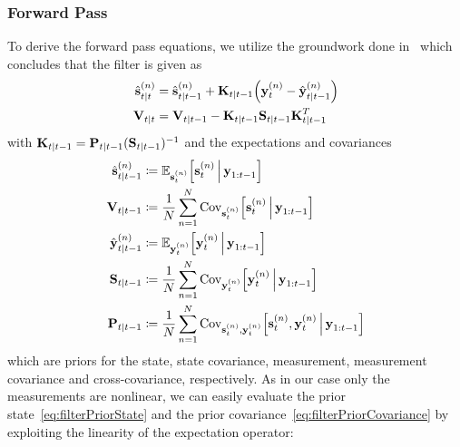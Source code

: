 	\subsubsection{Forward Pass}
		To derive the forward pass equations, we utilize the groundwork done in~\cite{deisenrothProbabilisticPerspectiveGaussian2011} which concludes that the filter is given as
		\begin{align*}
			\hat{\boldsymbol{\mathrm{s}}}_{t \vert t}^{(n)} & = \hat{\boldsymbol{\mathrm{s}}}_{t \vert t - 1}^{(n)} + \boldsymbol{\mathrm{K}}_{t \vert t - 1} \Big(\boldsymbol{\mathrm{y}}_t^{(n)} - \hat{\boldsymbol{\mathrm{y}}}_{t \vert t - 1}^{(n)}\Big) \\
			\boldsymbol{\mathrm{V}}_{t \vert t}       & = \boldsymbol{\mathrm{V}}_{t \vert t - 1} - \boldsymbol{\mathrm{K}}_{t \vert t - 1} \boldsymbol{\mathrm{S}}_{t \vert t - 1} \boldsymbol{\mathrm{K}}_{t \vert t - 1}^T
		\end{align*}
		with \( \boldsymbol{\mathrm{K}}_{t \vert t - 1} = \boldsymbol{\mathrm{P}}_{t \vert t - 1} (\boldsymbol{\mathrm{S}}_{t \vert t - 1})^{-1} \) and the expectations and covariances
		\begin{align}
			\hat{\boldsymbol{\mathrm{s}}}_{t \vert t - 1}^{(n)} & \coloneqq \mathbb{E}_{\boldsymbol{\mathrm{s}}_t^{(n)}}\Big[\boldsymbol{\mathrm{s}}_t^{(n)} \,\Big\vert\, \boldsymbol{\mathrm{y}}_{1:t - 1}\Big]  \label{eq:filterPriorState}                                                                     \\
			\boldsymbol{\mathrm{V}}_{t \vert t - 1}             & \coloneqq \frac{1}{N} \sum_{n = 1}^{N} \operatorname{Cov}_{\boldsymbol{\mathrm{s}}_t^{(n)}}\!\Big[\boldsymbol{\mathrm{s}}_t^{(n)} \,\Big\vert\, \boldsymbol{\mathrm{y}}_{1:t - 1}\Big]  \label{eq:filterPriorCovariance}                               \\
			\hat{\boldsymbol{\mathrm{y}}}_{t \vert t - 1}^{(n)} & \coloneqq \mathbb{E}_{\boldsymbol{\mathrm{y}}_t^{(n)}}\Big[\boldsymbol{\mathrm{y}}_t^{(n)} \,\Big\vert\, \boldsymbol{\mathrm{y}}_{1:t - 1}\Big]  \label{eq:filterPriorMeas}                                                                      \\
			\boldsymbol{\mathrm{S}}_{t \vert t - 1}             & \coloneqq \frac{1}{N} \sum_{n = 1}^{N} \operatorname{Cov}_{\boldsymbol{\mathrm{y}}_t^{(n)}}\!\Big[\boldsymbol{\mathrm{y}}_t^{(n)} \,\Big\vert\, \boldsymbol{\mathrm{y}}_{1:t - 1}\Big]  \label{eq:filterPriorMeasCov}                                  \\
			\boldsymbol{\mathrm{P}}_{t \vert t - 1}             & \coloneqq \frac{1}{N} \sum_{n = 1}^{N} \operatorname{Cov}_{\boldsymbol{\mathrm{s}}_t^{(n)}, \boldsymbol{\mathrm{y}}_t^{(n)}}\!\Big[\boldsymbol{\mathrm{s}}_t^{(n)}, \boldsymbol{\mathrm{y}}_t^{(n)} \,\Big\vert\, \boldsymbol{\mathrm{y}}_{1:t - 1}\Big]  \label{eq:filterPriorKalman}
		\end{align}
		which are priors for the state, state covariance, measurement, measurement covariance and cross-covariance, respectively. As in our case only the measurements are nonlinear, we can easily evaluate the prior state~\eqref{eq:filterPriorState} and the prior covariance~\eqref{eq:filterPriorCovariance} by exploiting the linearity of the expectation operator:
